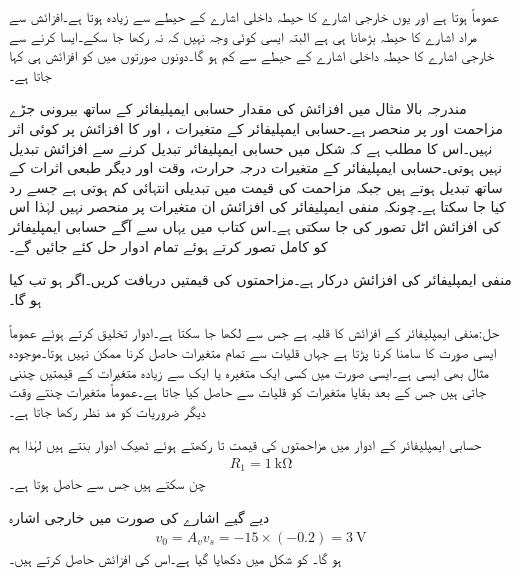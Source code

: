 عموماً  ہوتا ہے اور یوں خارجی اشارے کا حیطہ داخلی اشارے کے حیطے سے زیادہ ہوتا ہے۔افزائش سے مراد اشارے کا حیطہ بڑھانا ہی ہے البتہ ایسی کوئی وجہ نہیں کہ  نہ رکھا جا سکے۔ایسا کرنے سے خارجی اشارے کا حیطہ داخلی اشارے کے حیطے سے کم ہو گا۔دونوں صورتوں میں  کو افزائش ہی کہا جاتا ہے۔

مندرجہ بالا مثال میں افزائش  کی مقدار حسابی ایمپلیفائر کے ساتھ بیرونی جڑے مزاحمت  اور  پر منحصر ہے۔حسابی ایمپلیفائر کے  متغیرات ،  اور  کا افزائش پر کوئی اثر نہیں۔اس کا مطلب ہے کہ شکل  میں حسابی ایمپلیفائر تبدیل کرنے سے افزائش تبدیل نہیں ہوتی۔حسابی ایمپلیفائر کے متغیرات درجہ حرارت، وقت اور دیگر طبعی اثرات کے ساتھ تبدیل ہوتے ہیں جبکہ مزاحمت کی قیمت میں تبدیلی انتہائی کم ہوتی ہے جسے رد کیا جا سکتا ہے۔چونکہ منفی ایمپلیفائر کی افزائش ان متغیرات پر منحصر نہیں لہٰذا اس کی افزائش اٹل تصور کی جا سکتی ہے۔اس کتاب میں یہاں سے آگے حسابی ایمپلیفائر کو کامل تصور کرتے ہوئے تمام ادوار حل کئے جائیں گے۔

منفی ایمپلیفائر کی افزائش  درکار ہے۔مزاحمتوں کی قیمتیں دریافت کریں۔اگر  ہو تب  کیا ہو گا۔

حل:منفی ایمپلیفائر کے افزائش کا قلیہ  ہے  جس سے  لکھا جا سکتا ہے۔ادوار تخلیق کرتے ہوئے عموماً ایسی صورت کا سامنا کرنا پڑتا ہے جہاں قلیات سے تمام متغیرات حاصل کرنا ممکن نہیں ہوتا۔موجودہ مثال  بھی ایسی ہے۔ایسی صورت میں کسی ایک متغیرہ یا ایک سے زیادہ  متغیرات کے قیمتیں چننی جاتی ہیں جس کے بعد بقایا متغیرات کو قلیات سے حاصل کیا جاتا ہے۔عموماً متغیرات چنتے وقت دیگر ضروریات کو مد نظر رکھا جاتا ہے۔

حسابی ایمپلیفائر کے ادوار میں مزاحمتوں کی قیمت  تا  رکھتے ہوئے ٹھیک ادوار بنتے ہیں لہٰذا ہم
\begin{align*}
R_1=\SI{1}{\kilo\ohm}
\end{align*}
چن سکتے ہیں جس سے  حاصل ہوتا ہے۔

دیے گیے اشارے کی صورت میں خارجی اشارہ
\begin{align*}
v_0=A_v v_s = -15 \times (-0.2)=\SI{3}{\volt}
\end{align*}
ہو گا۔
 کو شکل  میں دکھایا گیا ہے۔اس کی افزائش  حاصل کرتے ہیں۔

